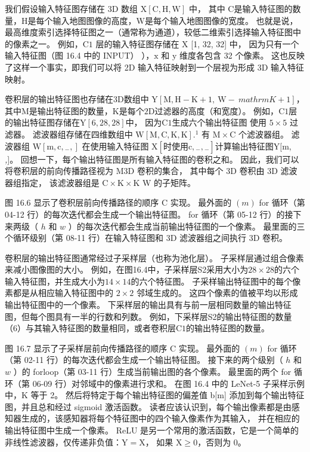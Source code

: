我们假设输入特征图存储在 $3 \mathrm{D}$ 数组 $\mathrm{X}[\mathrm{C}, \mathrm{H}, \mathrm{W}]$ 中，
其中 $\mathrm {C}$是输入特征图的数量，$\mathrm{H}$是每个输入地图图像的高度，$\mathrm{W}$是每个输入地图图像的宽度。 
也就是说，最高维度索引选择特征图之一（通常称为通道），较低二维索引选择输入特征图中的像素之一。 
例如，$\mathrm{C} 1$ 层的输入特征图存储在 $\mathrm{X}$ [1, 32, 32] 中，
因为只有一个输入特征图（图 16.4 中的 INPUT） ），$\mathrm{x}$ 和 $\mathrm{y}$ 维度各包含 32 个像素。 
这也反映了这样一个事实，即我们可以将 2D 输入特征映射到一个层视为形成 3D 输入特征映射。

卷积层的输出特征图也存储在3D数组中 $\mathrm{Y}[\mathrm{M}, \mathrm{H}-\mathrm{K}+1, \mathrm{~W}-\ mathrm{K}+1]$，
其中$\mathrm{M}$是输出特征图的数量，$\mathrm{K}$是每个$2\mathrm{D}$过滤器的高度（和宽度）。 
例如，$\mathrm{C} 1$层的输出特征图存储在$\mathrm{Y}[6,28,28]$中，
因为$\mathrm{C} 1$生成六个输出特征图 使用 $5 \times 5$ 过滤器。 
滤波器组存储在四维数组中 $\mathrm{W}[\mathrm{M}, \mathrm{C}, \mathrm{K}, \mathrm{K}] .{ }^{1}$ 
有 $\mathrm{M} \times \mathrm{C}$ 个滤波器组。 
滤波器组 $\mathrm{W}\left[\mathrm{m}, \mathrm{c},{ }_{-},\right]$
在使用输入特征图 $\mathrm{X}\left[ 时使用 \mathrm{c},{ }_{-},{ }_{-}\right]$计算输出特征图$\mathrm{Y}[\mathrm{m}$, \textit{,}]。 
回想一下，每个输出特征图是所有输入特征图的卷积之和。 
因此，我们可以将卷积层的前向传播路径视为 $\mathrm{M} 3 \mathrm{D}$ 卷积的集合，
其中每个 3D 卷积由 $3 \mathrm{D}$ 滤波器组指定，
该滤波器组是 $\mathrm{C} \times \mathrm{K} \times \mathrm{K}$ $\mathrm{W}$ 的子矩阵。

图 16.6 显示了卷积层前向传播路径的顺序 $\mathrm{C}$ 实现。 
最外面的 $(m)$ for 循环（第 04-12 行）的每次迭代都会生成一个输出特征图。 
for 循环（第 05-12 行）的接下来两级（ $h$ 和 $w$ ）的每次迭代都会生成当前输出特征图的一个像素。 
最里面的三个循环级别（第 08-11 行）在输入特征图和 3D 滤波器组之间执行 3D 卷积。

卷积层的输出特征图通常经过子采样层（也称为池化层）。 子采样层通过组合像素来减小图像图的大小。 
例如，在图16.4中，子采样层S2采用大小为$28×28$的六个输入特征图，并生成大小为$14×14$的六个特征图。 
子采样输出特征图中的每个像素都是从相应输入特征图中的 $2 \times 2$ 邻域生成的。 
这四个像素的值被平均以形成输出特征图中的一个像素。 
下采样层的输出具有与前一层相同数量的输出特征图，但每个图具有一半的行数和列数。 
例如，下采样层S2的输出特征图的数量（6）与其输入特征图的数量相同，或者卷积层$\mathrm{C} 1$的输出特征图的数量。

图 16.7 显示了子采样层前向传播路径的顺序 $\mathrm{C}$ 实现。 
最外面的 $(m)$ for 循环（第 02-11 行）的每次迭代都会生成一个输出特征图。 
接下来的两个级别（ $h$ 和 $w$ ）的 forloop（第 03-11 行）生成当前输出图的各个像素。 
最里面的两个 for 循环（第 06-09 行）对邻域中的像素进行求和。 
在图 16.4 中的 LeNet-5 子采样示例中，$\mathrm{K}$ 等于 2。 
然后将特定于每个输出特征图的偏差值 b[m] 添加到每个输出特征图，并且总和经过 sigmoid 激活函数。 
读者应该认识到，每个输出像素都是由感知器生成的，该感知器将每个特征图中的四个输入像素作为其输入，
并在相应的输出特征图中生成一个像素。 
ReLU 是另一个常用的激活函数，它是一个简单的非线性滤波器，仅传递非负值：$\mathrm{Y}=\mathrm{X}$，
如果 $\mathrm{X} \geq 0$，否则为 0。

